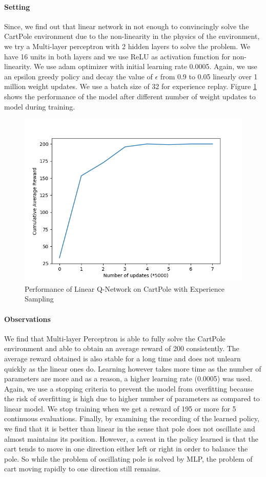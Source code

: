 \documentclass[12pt]{article}
\begin{document}
\paragraph{Setting} Since, we find out that linear network in not enough to convincingly solve the CartPole environment due to the non-linearity in the physics of the environment, we try a Multi-layer perceptron with 2 hidden layers to solve the problem. We have 16 units in both layers and we use ReLU as activation function for non-linearity. We use adam optimizer with initial learning rate 0.0005. Again, we use an epsilon greedy policy and decay the value of $\epsilon$ from 0.9 to 0.05 linearly over 1 million weight updates. We use a batch size of 32 for experience replay. Figure \ref{fig:03} shows the performance of the model after different number of weight updates to model during training.
\begin{figure}[h]
  \centering
  \vspace{-5mm}
  \includegraphics[width=0.8\linewidth]{figures/reward_plot_04.png}
  \caption{Performance of Linear Q-Network on CartPole with Experience Sampling}
  \label{fig:03}
\end{figure}
\paragraph{Observations} We find that Multi-layer Perceptron is able to fully solve the CartPole environment and able to obtain an average reward of 200 consistently. The average reward obtained is also stable for a long time and does not unlearn quickly as the linear ones do. Learning however takes more time as the number of parameters are more and as a reason, a higher learning rate (0.0005) was used. Again, we use a stopping criteria to prevent the model from overfitting because the risk of overfitting is high due to higher number of parameters as compared to linear model. We stop training when we get a reward of 195 or more for 5 continuous evaluations. Finally, by examining the recording of the learned policy, we find that it is better than linear in the sense that pole does not oscillate and almost maintains its position. However, a caveat in the policy learned is that the cart tends to move in one direction either left or right in order to balance the pole. So while the problem of oscillating pole is solved by MLP, the problem of cart moving rapidly to one direction still remains. 
\end{document}

